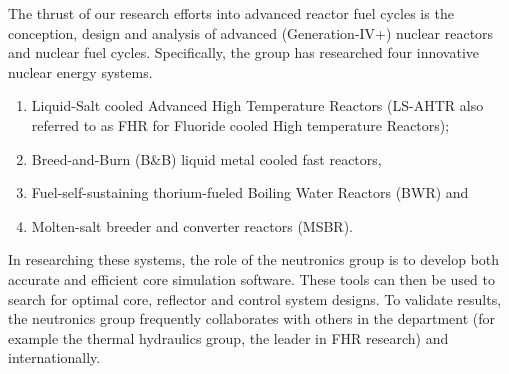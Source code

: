 The thrust of our research efforts into advanced reactor fuel cycles is the conception, design and analysis of advanced (Generation-IV+) nuclear reactors and nuclear fuel cycles. 
Specifically, the group has researched four innovative nuclear energy systems.
\begin{enumerate}
	\item Liquid-Salt cooled Advanced High Temperature Reactors (LS-AHTR also referred to as FHR for Fluoride cooled High temperature Reactors);
	\item Breed-and-Burn (B\&B) liquid metal cooled fast reactors,
	\item Fuel-self-sustaining thorium-fueled Boiling Water Reactors (BWR) and
	\item Molten-salt breeder and converter reactors (MSBR).
\end{enumerate}
In researching these systems, the role of the neutronics group is to develop both accurate and efficient core simulation software.
These tools can then be used to search for optimal core, reflector and control system designs. 
To validate results, the neutronics group frequently collaborates with others in the department (for example the thermal hydraulics group, the leader in FHR research) and internationally.


\vspace{-0.5cm}


